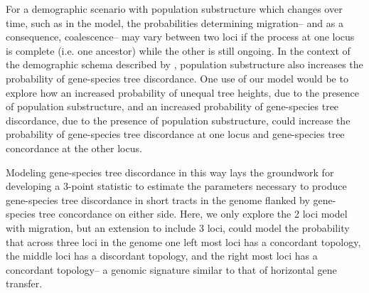 \documentclass[11pt,oneside]{amsart}
\begin{document}
For a demographic scenario with population substructure which changes over time, such as in the \cite{SlatkinPollack2008} model, the probabilities determining migration-- and as a consequence, coalescence-- may vary between two loci if the process at one locus is complete (i.e. one ancestor) while the other is still ongoing. In the context of the demographic schema described by \cite{SlatkinPollack2008}, population substructure also increases the probability of gene-species tree discordance. One use of our model would be to explore how an increased probability of unequal tree heights, due to the presence of population substructure, and an increased probability of gene-species tree discordance, due to the presence of population substructure, could increase the probability of gene-species tree discordance at one locus and gene-species tree concordance at the other locus. 

Modeling gene-species tree discordance in this way lays the groundwork for developing a 3-point statistic to estimate the parameters necessary to produce gene-species tree discordance in short tracts in the genome flanked by gene-species tree concordance on either side. Here, we only explore the 2 loci model with migration, but an extension to include 3 loci, could model the probability that across three loci in the genome one left most loci has a concordant topology, the middle loci has a discordant topology, and the right most loci has a concordant topology-- a genomic signature similar to that of horizontal gene transfer.



\end{document}

